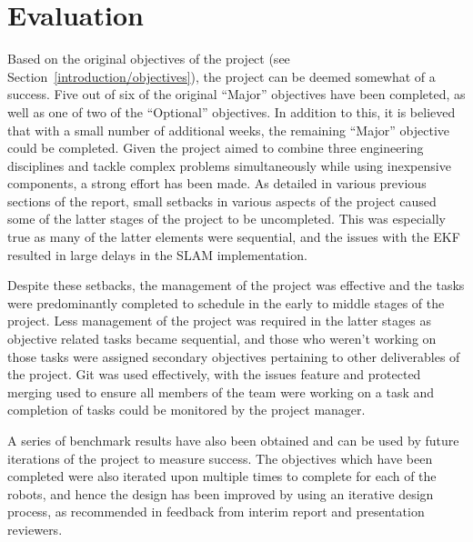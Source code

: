 
\chapter{Evaluation}\label{eval}
Based on the original objectives of the project (see Section~\ref{introduction/objectives}), the project can be deemed somewhat of a success. Five out of six of
the original ``Major'' objectives have been completed, as well as one of two of
the ``Optional'' objectives. In addition to this, it is believed that with a
small number of additional weeks, the remaining ``Major'' objective could
be completed. Given the project aimed to combine three engineering
disciplines and tackle complex problems simultaneously while using inexpensive components, a strong
effort has been made.
As detailed in various previous sections of the report, small setbacks in
various aspects of the project caused some of the latter stages of the project to be
uncompleted. This was especially true as many of the latter elements were sequential,
and the issues with the EKF resulted in large delays in the SLAM implementation.

Despite these setbacks, the management of the project was effective and the tasks were predominantly completed to schedule in the early to middle
stages of the project. Less management of the project was required in the latter
stages as objective related tasks became sequential, and those who weren't
working on those tasks were assigned secondary objectives pertaining to other deliverables of the project. Git was used effectively, with the
issues feature and protected merging used to ensure all members of the team were
working on a task and completion of tasks could be monitored by the project
manager.

A series of benchmark results have also been obtained and can be used by future
iterations of the project to measure success. The
objectives which have been completed were also iterated upon multiple times to
complete for each of the robots, and hence the design has
been improved by using an iterative design process, as recommended in feedback from interim report and presentation reviewers.

